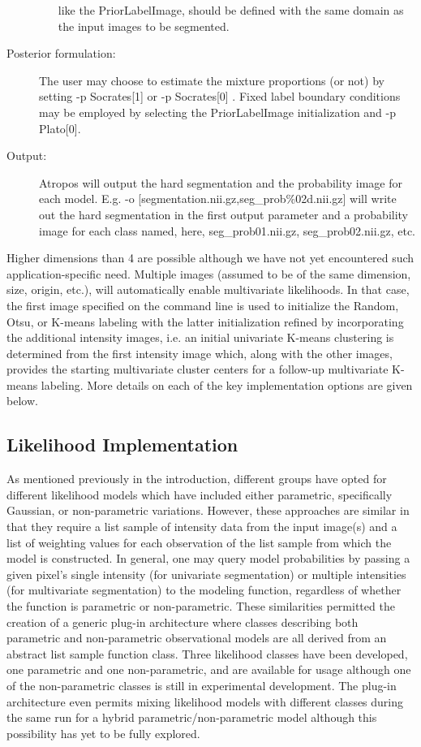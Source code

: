 \documentclass[11pt,english]{article}
\begin{document}
\begin{description}
\begin{itemize}
  like the {\ttfamily PriorLabelImage}, should be defined with the same domain as
  the input images to be segmented.  
\end{itemize}
\item[Posterior formulation:]  The user may choose to estimate the
  mixture proportions (or not) by setting  {\ttfamily -p Socrates[1]}
  or {\ttfamily -p Socrates[0] }.  Fixed label boundary conditions may be employed by
  selecting the {\ttfamily PriorLabelImage} initialization and   {\ttfamily -p Plato[0]}.
\item[Output:] Atropos will output the hard segmentation and the
  probability image for each model.  E.g.  {\ttfamily -o
    [segmentation.nii.gz,seg\_prob\%02d.nii.gz]} will write
  out the hard segmentation in the first output parameter and a
  probability image for each class named, here, seg\_prob01.nii.gz,
  seg\_prob02.nii.gz, etc. 
\end{description}
Higher dimensions than 4 are possible although we have not yet encountered such 
application-specific need.  Multiple images (assumed to be of the same
dimension, size, origin, etc.), will automatically enable multivariate
likelihoods.  In that case, the first image specified on the command
line is used to initialize the Random, Otsu, or K-means labeling with
the latter initialization refined by incorporating the additional intensity images, i.e. an initial univariate K-means clustering is
determined from the first intensity image which, along with the other
images, provides the starting multivariate cluster centers for a
follow-up multivariate K-means labeling.  More details on each of the
key implementation options are given below.

\subsection{Likelihood Implementation}
As mentioned previously in the introduction, different groups have
opted for different likelihood models which have included either
parametric, specifically Gaussian, or non-parametric variations.
However, these approaches are similar in that they require a list
sample of intensity data from the input image(s) and a list of
weighting values for each observation of the list sample from which
the model is constructed.  In general, one may query model
probabilities by passing a given pixel's single intensity (for
univariate segmentation) or multiple intensities (for multivariate
segmentation) to the modeling function, regardless of whether the
function is parametric or non-parametric.  These similarities permitted
the creation of a generic plug-in architecture where classes
describing both parametric and non-parametric observational models are
all derived from an abstract list sample function class.  Three
likelihood classes have been developed, one parametric and one
non-parametric, and are available for usage although one of the
non-parametric classes is still in experimental development.  The
plug-in architecture even permits mixing likelihood models with
different classes during the same run for a hybrid
parametric/non-parametric model although this possibility has yet
to be fully explored.
\end{document}

